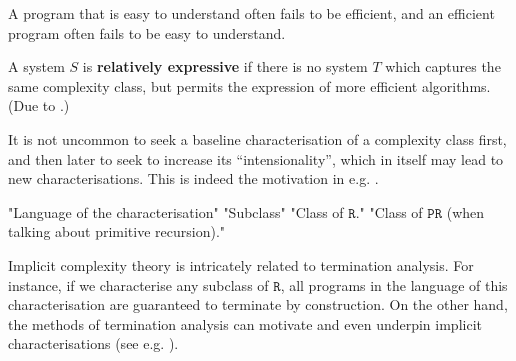 
A program that is easy to understand often fails to be efficient, and an
efficient program often fails to be easy to understand.

\begin{notion} A system $S$ is \textbf{relatively expressive} if there is no
system $T$ which captures the same complexity class, but permits the expression
of more efficient algorithms. (Due to \cite{jones-2001}.) \end{notion}

It is not uncommon to seek a baseline characterisation of a complexity class
first, and then later to seek to increase its ``intensionality'', which in
itself may lead to new characterisations. This is indeed the motivation in e.g.
\cite{hofmann-1999, marion-moyen-2000, niggl-2005, niggl-wunderlich-2006,
marion-pechoux-2008, jones-kristiansen-2009}.

"Language of the characterisation"
"Subclass"
"Class of $\mathtt{R}$."
"Class of $\mathtt{PR}$ (when talking about primitive recursion)."

Implicit complexity theory is intricately related to termination analysis. For
instance, if we characterise any subclass of $\mathtt{R}$, all programs in the
language of this characterisation are guaranteed to terminate by construction.
On the other hand, the methods of termination analysis can motivate and even
underpin implicit characterisations (see e.g.  \cite{marion-2003}).







